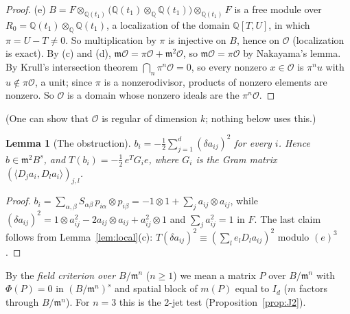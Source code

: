 \documentclass[11pt]{amsart}
\newcommand{\Q}{\mathbb{Q}}
\theoremstyle{plain}
\newtheorem{lemma}[theorem]{Lemma}
\theoremstyle{definition}
\begin{document}
\begin{proof}
(e) $B=F\otimes_{\Q(t_1)}\bigl(\Q(t_1)\otimes_\Q\Q(t_1)\bigr)\otimes_{\Q(t_1)}F$ is a free module over
$R_0=\Q(t_1)\otimes_\Q\Q(t_1)$, a localization of the domain $\Q[T,U]$, in which $\pi=U-T\ne0$. So
multiplication by $\pi$ is injective on $B$, hence on $\mathcal O$ (localization is exact). By (c) and (d),
$\mathfrak m\mathcal O=\pi\mathcal O+\mathfrak m^2\mathcal O$, so $\mathfrak m\mathcal O=\pi\mathcal O$ by
Nakayama's lemma. By Krull's intersection theorem $\bigcap_n\pi^n\mathcal O=0$, so every nonzero
$x\in\mathcal O$ is $\pi^nu$ with $u\notin\pi\mathcal O$, a unit; since $\pi$ is a nonzerodivisor, products
of nonzero elements are nonzero. So $\mathcal O$ is a domain whose nonzero ideals are the $\pi^n\mathcal O$.
\end{proof}

\noindent(One can show that $\mathcal O$ is regular of dimension $k$; nothing below uses this.)

\begin{lemma}[The obstruction]\label{lem:obstruction}
$b_i=-\tfrac12\sum_{j=1}^d(\delta a_{ij})^2$ for every $i$. Hence $b\in\mathfrak m^2B^s$, and
$T(b_i)=-\tfrac12\,e^TG_ie$, where $G_i$ is the Gram matrix $(\langle D_ja_i,D_la_i\rangle)_{j,l}$.
\end{lemma}

\begin{proof}
$b_i=\sum_{\alpha,\beta}S_{\alpha\beta}\,p_{i\alpha}\otimes p_{i\beta}=-1\otimes1+\sum_ja_{ij}\otimes a_{ij}$,
while $(\delta a_{ij})^2=1\otimes a_{ij}^2-2a_{ij}\otimes a_{ij}+a_{ij}^2\otimes1$ and
$\sum_ja_{ij}^2=1$ in $F$. The last claim follows from Lemma~\ref{lem:local}(c):
$T(\delta a_{ij})^2\equiv(\sum_le_lD_la_{ij})^2$ modulo $(e)^3$.
\end{proof}

\noindent By the \emph{field criterion over $B/\mathfrak m^n$} ($n\ge1$) we mean a matrix $P$ over
$B/\mathfrak m^n$ with $\Phi(P)=0$ in $(B/\mathfrak m^n)^s$ and spatial block of $m(P)$ equal to $I_d$ ($m$
factors through $B/\mathfrak m^n$). For $n=3$ this is the 2-jet test (Proposition~\ref{prop:J2}).
\end{document}

